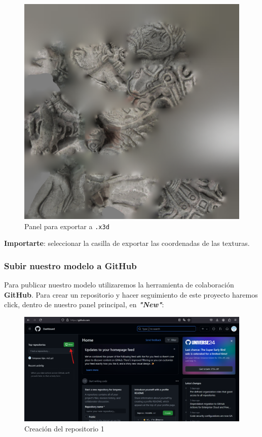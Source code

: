 \documentclass[options]{article}
\begin{document}
\begin{figure}[H]
    \centering
    \includegraphics[scale=0.45]{images/PoissonMeshMayanSculpture_topo_sin_fisuras_tex.png}
    \caption{Panel para exportar a \texttt{.x3d}}
\end{figure}

\textbf{Importarte}: seleccionar la casilla de exportar las coordenadas de las texturas.

\pagebreak

\subsubsection{Subir nuestro modelo a GitHub}

Para publicar nuestro modelo utilizaremos la herramienta de colaboración \textbf{GitHub}. Para crear un repositorio y hacer seguimiento de este proyecto haremos click, dentro de nuestro panel principal, en \textbf{\textit{"New"}}:

\begin{figure}[H]
    \centering
    \includegraphics[scale=0.34]{images/github_01.png}
    \caption{Creación del repositorio 1}
\end{figure}
\end{document}
